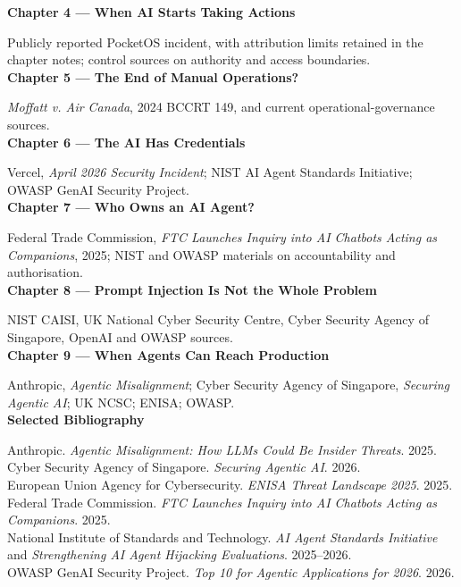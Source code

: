 \documentclass[10pt,twoside]{article}
\begin{document}
{\sffamily\bfseries Chapter 4 — When AI Starts Taking Actions}\par Publicly reported PocketOS incident, with attribution limits retained in the chapter notes; control sources on authority and access boundaries.\\[9pt]
{\sffamily\bfseries Chapter 5 — The End of Manual Operations?}\par \emph{Moffatt v. Air Canada}, 2024 BCCRT 149, and current operational-governance sources.\\[9pt]
{\sffamily\bfseries Chapter 6 — The AI Has Credentials}\par Vercel, \emph{April 2026 Security Incident}; NIST AI Agent Standards Initiative; OWASP GenAI Security Project.\\[9pt]
{\sffamily\bfseries Chapter 7 — Who Owns an AI Agent?}\par Federal Trade Commission, \emph{FTC Launches Inquiry into AI Chatbots Acting as Companions}, 2025; NIST and OWASP materials on accountability and authorisation.\\[9pt]
{\sffamily\bfseries Chapter 8 — Prompt Injection Is Not the Whole Problem}\par NIST CAISI, UK National Cyber Security Centre, Cyber Security Agency of Singapore, OpenAI and OWASP sources.\\[9pt]
{\sffamily\bfseries Chapter 9 — When Agents Can Reach Production}\par Anthropic, \emph{Agentic Misalignment}; Cyber Security Agency of Singapore, \emph{Securing Agentic AI}; UK NCSC; ENISA; OWASP.\\[18pt]
{\sffamily\bfseries\large Selected Bibliography}\par\vspace{8pt}
Anthropic. \emph{Agentic Misalignment: How LLMs Could Be Insider Threats}. 2025.\\
Cyber Security Agency of Singapore. \emph{Securing Agentic AI}. 2026.\\
European Union Agency for Cybersecurity. \emph{ENISA Threat Landscape 2025}. 2025.\\
Federal Trade Commission. \emph{FTC Launches Inquiry into AI Chatbots Acting as Companions}. 2025.\\
National Institute of Standards and Technology. \emph{AI Agent Standards Initiative} and \emph{Strengthening AI Agent Hijacking Evaluations}. 2025–2026.\\
OWASP GenAI Security Project. \emph{Top 10 for Agentic Applications for 2026}. 2026.\\
\end{document}
